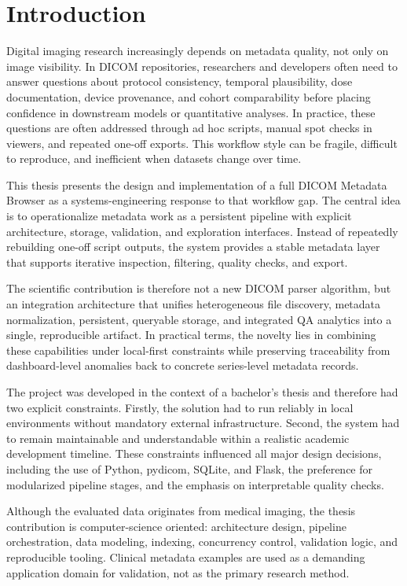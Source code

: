 \chapter{Introduction}
Digital imaging research increasingly depends on metadata quality, not only on image visibility. In DICOM repositories, researchers and developers often need to answer questions about protocol consistency, temporal plausibility, dose documentation, device provenance, and cohort comparability before placing confidence in downstream models or quantitative analyses. In practice, these questions are often addressed through ad hoc scripts, manual spot checks in viewers, and repeated one-off exports. This workflow style can be fragile, difficult to reproduce, and inefficient when datasets change over time.

This thesis presents the design and implementation of a full DICOM Metadata Browser as a systems-engineering response to that workflow gap. The central idea is to operationalize metadata work as a persistent pipeline with explicit architecture, storage, validation, and exploration interfaces. Instead of repeatedly rebuilding one-off script outputs, the system provides a stable metadata layer that supports iterative inspection, filtering, quality checks, and export.

The scientific contribution is therefore not a new DICOM parser algorithm, but an integration architecture that unifies heterogeneous file discovery, metadata normalization, persistent, queryable storage, and integrated QA analytics into a single, reproducible artifact. In practical terms, the novelty lies in combining these capabilities under local-first constraints while preserving traceability from dashboard-level anomalies back to concrete series-level metadata records.

The project was developed in the context of a bachelor's thesis and therefore had two explicit constraints. Firstly, the solution had to run reliably in local environments without mandatory external infrastructure. Second, the system had to remain maintainable and understandable within a realistic academic development timeline. These constraints influenced all major design decisions, including the use of Python, pydicom, SQLite, and Flask, the preference for modularized pipeline stages, and the emphasis on interpretable quality checks.

Although the evaluated data originates from medical imaging, the thesis contribution is computer-science oriented: architecture design, pipeline orchestration, data modeling, indexing, concurrency control, validation logic, and reproducible tooling. Clinical metadata examples are used as a demanding application domain for validation, not as the primary research method.

